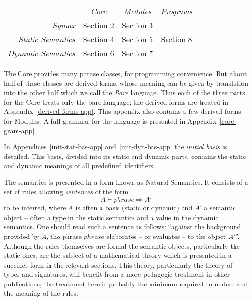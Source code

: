 \vspace*{3mm}
\begin{tabular}{rccc}
                & {\em Core} & {\em Modules} & {\em Programs} \\
\cline{2-4}
{\em Syntax}    &\multicolumn{1}{|c}{Section 2}
                             &\multicolumn{1}{|c}{Section 3}
                                             &\multicolumn{1}{|c|}{ }\\
\cline{2-3}
{\em Static Semantics}
                &\multicolumn{1}{|c}{Section 4}
                             &\multicolumn{1}{|c}{Section 5}
                                             &\multicolumn{1}{|c|}{Section 8}\\
\cline{2-3}
{\em Dynamic Semantics}
                &\multicolumn{1}{|c}{Section 6}
                             &\multicolumn{1}{|c}{Section 7}
                                             &\multicolumn{1}{|c|}{}\\
\cline{2-4}
\end{tabular}
\vspace*{3mm}


The Core provides many phrase classes, for programming convenience.
But about half of these classes are derived forms, whose meaning can be
given by translation into the other half which we call the
{\sl Bare} language.   
Thus each of the three parts for the Core treats only the bare language;
the derived forms are treated in  Appendix~\ref{derived-forms-app}.
This appendix also contains a few derived forms for Modules.
A full grammar for the language is presented in
Appendix~\ref{core-gram-app}.

In Appendices~\ref{init-stat-bas-app} and~\ref{init-dyn-bas-app} 
the {\sl initial basis} is detailed.  This basis,
divided into its static and dynamic parts, contains the static and
dynamic meanings of all predefined identifiers.

The semantics is presented in a form  known as Natural
Semantics.  It consists of a set of rules allowing 
{\sl sentences} of the form
\[ A \vdash phrase \Rightarrow A' \]
to be inferred, where $A$ is often a basis (static or dynamic) and $A'$ a
semantic object
-- often a type in the static semantics and a value in the dynamic
semantics. One should read such a sentence as follows: ``against
the background provided by
$A$, the phrase $phrase$ elaborates -- or evaluates -- to the object
$A'$''.
Although the rules themselves are formal the semantic
objects, particularly the static ones, are the subject of a mathematical
theory which is presented in a succinct form in the relevant sections.
This theory, particularly the theory of types and signatures, will
benefit from a more pedagogic treatment in other publications; the
treatment here is
probably the minimum required to understand the meaning of the rules.

